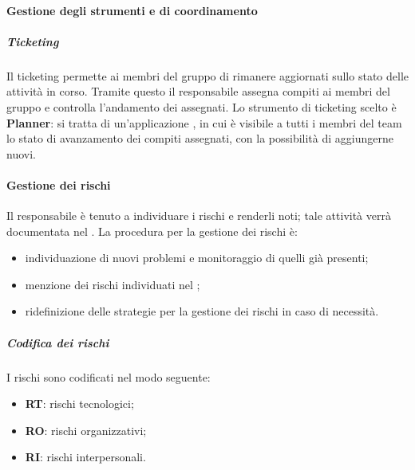 \paragraph{Gestione degli strumenti e di coordinamento}
\subparagraph{Ticketing}
Il ticketing permette ai membri del gruppo di rimanere aggiornati sullo stato delle attività in corso. Tramite questo il responsabile assegna compiti ai membri del gruppo e controlla l'andamento dei  assegnati. Lo strumento di ticketing scelto è \textbf{Planner}: si tratta di un'applicazione , in cui è visibile a tutti i membri del team lo stato di avanzamento dei compiti assegnati, con la possibilità di aggiungerne nuovi. 

\paragraph{Gestione dei rischi}
Il responsabile è tenuto a individuare i rischi e renderli noti; tale attività verrà documentata nel \PdPv{}. La procedura per la gestione dei rischi è: 
\begin{itemize}
\item individuazione di nuovi problemi e monitoraggio di quelli già presenti;
\item menzione dei rischi individuati nel \PdPv{}; 
\item ridefinizione delle strategie per la gestione dei rischi in caso di necessità.
\end{itemize}

\subparagraph{Codifica dei rischi}
I rischi sono codificati nel modo seguente: 
\begin{itemize}
\item  \textbf{RT}: rischi tecnologici; 
\item \textbf{RO}: rischi organizzativi;
\item   \textbf{RI}: rischi interpersonali.
\end{itemize}

